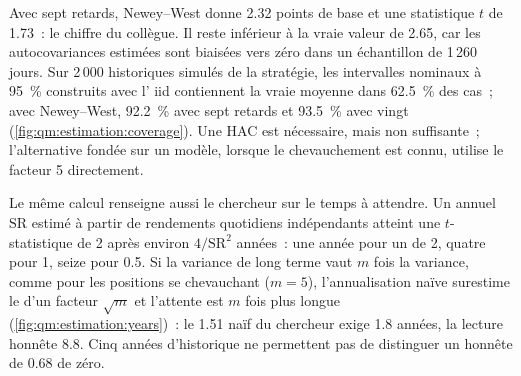Avec sept retards, Newey--West donne 2.32 points de base et une statistique $t$ de 1.73~: le chiffre du collègue. Il reste
inférieur à la vraie valeur de 2.65, car les autocovariances estimées sont biaisées vers zéro dans un échantillon de 1\,260 jours. Sur
2\,000 historiques simulés de la stratégie, les intervalles nominaux à 95~\% construits avec l' iid contiennent la vraie moyenne
dans 62.5~\% des cas~; avec Newey--West, 92.2~\% avec sept retards et 93.5~\% avec vingt (\cref{fig:qm:estimation:coverage}). Une  HAC est nécessaire, mais non suffisante~; l'alternative fondée sur un modèle, lorsque le chevauchement est connu, utilise le facteur 5
directement.

\begin{omfigure}

\label{fig:qm:estimation:coverage}
\end{omfigure}

Le même calcul renseigne aussi le chercheur sur le temps à attendre. Un  annuel $\mathrm{SR}$ estimé à partir de rendements quotidiens indépendants
atteint une $t$-statistique de 2 après environ $4/\mathrm{SR}^2$ années~: une année pour un  de 2, quatre pour 1, seize pour
0.5. Si la variance de long terme vaut $m$ fois la variance, comme pour les positions se chevauchant ($m = 5$), l'annualisation naïve
surestime le  d'un facteur $\sqrt m$ et l'attente est $m$ fois plus longue (\cref{fig:qm:estimation:years})~: le 1.51 naïf du chercheur
exige 1.8 années, la lecture honnête 8.8. Cinq années d'historique ne permettent pas de distinguer un  honnête de
0.68 de zéro.

